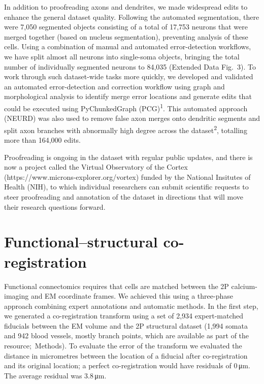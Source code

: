 \documentclass{article}
\begin{document}
In addition to proofreading axons and dendrites, we made widespread edits to enhance the general dataset quality. Following the automated segmentation, there were 7,050 segmented objects consisting of a total of 17,753 neurons that were merged together (based on nucleus segmentation), preventing analysis of these cells. Using a combination of manual and automated error-detection workflows, we have split almost all neurons into single-soma objects, bringing the total number of individually segmented neurons to 84,035 (Extended Data Fig.~3). To work through such dataset-wide tasks more quickly, we developed and validated an automated error-detection and correction workflow using graph and morphological analysis to identify merge error locations and generate edits that could be executed using PyChunkedGraph (PCG)\textsuperscript{1}. This automated approach (NEURD) was also used to remove false axon merges onto dendritic segments and split axon branches with abnormally high degree across the dataset\textsuperscript{2}, totalling more than 164,000 edits.

Proofreading is ongoing in the dataset with regular public updates, and there is now a project called the Virtual Observatory of the Cortex (https://www.microns-explorer.org/vortex) funded by the National Insitutes of Health (NIH), to which individual researchers can submit scientific requests to steer proofreading and annotation of the dataset in directions that will move their research questions forward.

\section*{Functional–structural co-registration}

Functional connectomics requires that cells are matched between the 2P calcium-imaging and EM coordinate frames. We achieved this using a three-phase approach combining expert annotations and automatic methods. In the first step, we generated a co-registration transform using a set of 2,934 expert-matched fiducials between the EM volume and the 2P structural dataset (1,994 somata and 942 blood vessels, mostly branch points, which are available as part of the resource;~Methods). To evaluate the error of the transform we evaluated the distance in micrometres between the location of a fiducial after co-registration and its original location; a perfect co-registration would have residuals of 0\,μm. The average residual was 3.8\,μm.
\end{document}
